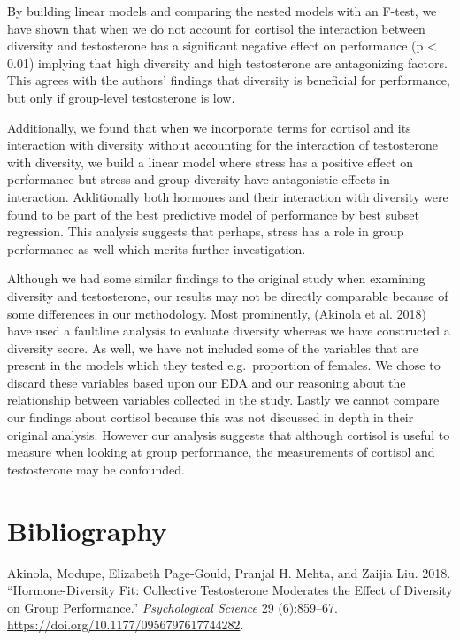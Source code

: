 \documentclass[]{article}
\begin{document}
By building linear models and comparing the nested models with an
F-test, we have shown that when we do not account for cortisol the
interaction between diversity and testosterone has a significant
negative effect on performance (p \textless{} 0.01) implying that high
diversity and high testosterone are antagonizing factors. This agrees
with the authors' findings that diversity is beneficial for performance,
but only if group-level testosterone is low.

Additionally, we found that when we incorporate terms for cortisol and
its interaction with diversity without accounting for the interaction of
testosterone with diversity, we build a linear model where stress has a
positive effect on performance but stress and group diversity have
antagonistic effects in interaction. Additionally both hormones and
their interaction with diversity were found to be part of the best
predictive model of performance by best subset regression. This analysis
suggests that perhaps, stress has a role in group performance as well
which merits further investigation.

Although we had some similar findings to the original study when
examining diversity and testosterone, our results may not be directly
comparable because of some differences in our methodology. Most
prominently, (Akinola et al. 2018) have used a faultline analysis to
evaluate diversity whereas we have constructed a diversity score. As
well, we have not included some of the variables that are present in the
models which they tested e.g.~proportion of females. We chose to discard
these variables based upon our EDA and our reasoning about the
relationship between variables collected in the study. Lastly we cannot
compare our findings about cortisol because this was not discussed in
depth in their original analysis. However our analysis suggests that
although cortisol is useful to measure when looking at group
performance, the measurements of cortisol and testosterone may be
confounded.

\hypertarget{bibliography}{%
\section*{Bibliography}\label{bibliography}}

\hypertarget{refs}{}
\leavevmode\hypertarget{ref-Akinola2018}{}%
Akinola, Modupe, Elizabeth Page-Gould, Pranjal H. Mehta, and Zaijia Liu.
2018. ``Hormone-Diversity Fit: Collective Testosterone Moderates the
Effect of Diversity on Group Performance.'' \emph{Psychological Science}
29 (6):859--67. \url{https://doi.org/10.1177/0956797617744282}.
\end{document}
